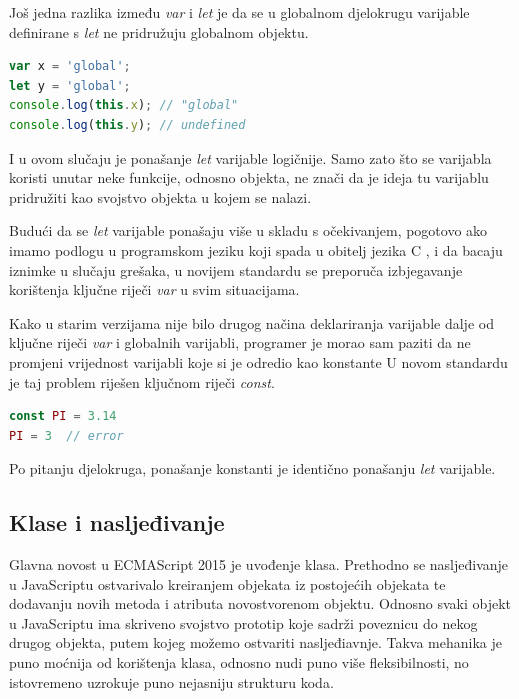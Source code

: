 \documentclass[times, utf8, zavrsni, numeric]{fer}
\newcommand{\razmakp}{\vspace{18pt}}
\newcommand{\razmaks}{\vspace{10pt}}
\begin{document}
\razmakp

Još jedna razlika između \emph{var} i \emph{let} je da se u globalnom djelokrugu varijable definirane s \emph{let} ne pridružuju globalnom objektu.

\razmakp
\begin{lstlisting}[language=JavaScript, caption={Odnos \emph{var} i \emph{let} s globalnim objektom}]
var x = 'global';
let y = 'global';
console.log(this.x); // "global"
console.log(this.y); // undefined
\end{lstlisting}
\razmaks

I u ovom slučaju je ponašanje \emph{let} varijable logičnije. Samo zato što se varijabla koristi unutar neke funkcije, odnosno objekta, ne znači da je ideja tu varijablu pridružiti kao svojstvo objekta u kojem se nalazi.

\razmakp

Budući da se \emph{let} varijable ponašaju više u skladu s očekivanjem, pogotovo ako imamo podlogu u programskom jeziku koji spada u obitelj jezika C , i da bacaju iznimke u slučaju grešaka, u novijem standardu se preporuča izbjegavanje korištenja ključne riječi \emph{var} u svim situacijama.

\razmakp
\razmakp

Kako u starim verzijama nije bilo drugog načina deklariranja varijable dalje od ključne riječi \emph{var} i globalnih varijabli, programer je morao sam paziti da ne promjeni vrijednost varijabli koje si je odredio kao konstante
U novom standardu je taj problem riješen ključnom riječi \emph{const}.\citep{MDNConst}

\razmakp
\begin{lstlisting}[language=JavaScript, caption={Deklariranje konstante}]
const PI = 3.14
PI = 3  // error
\end{lstlisting}
\razmaks

Po pitanju djelokruga, ponašanje konstanti je identično ponašanju \emph{let} varijable.

\razmakp


\subsection{Klase i nasljeđivanje}

Glavna novost u ECMAScript 2015 je uvođenje klasa.
Prethodno se nasljeđivanje u JavaScriptu ostvarivalo kreiranjem objekata iz postojećih objekata te dodavanju novih metoda i atributa novostvorenom objektu.
Odnosno svaki objekt u JavaScriptu ima skriveno svojstvo prototip  koje sadrži poveznicu do nekog drugog objekta, putem kojeg možemo ostvariti nasljeđiavnje.\citep{MDNPrototype}
Takva mehanika je puno moćnija od korištenja klasa, odnosno nudi puno više fleksibilnosti, no istovremeno uzrokuje puno nejasniju strukturu koda.
\end{document}
